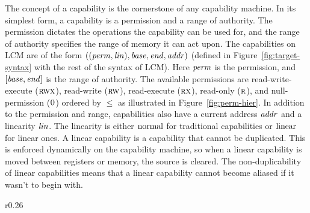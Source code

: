 \documentclass[acmsmall,review,showframe]{acmart}\settopmatter{printfolios=true,printccs=false,printacmref=false}
\newcommand{\trgcm}{\textsc{LCM}}
\begin{document}
The concept of a capability is the cornerstone of any capability machine.
In its simplest form, a capability is a permission and a range of authority.
The permission dictates the operations the capability can be used for, and the range of authority specifies the range of memory it can act upon.
The capabilities on \trgcm{} are of the form $((\mathit{perm},\mathit{lin}),\mathit{base},\mathit{end},\mathit{addr})$ (defined in Figure~\ref{fig:target-syntax} with the rest of the syntax of \trgcm{}). Here $\mathit{perm}$ is the permission, and $[\mathit{base},\mathit{end}]$ is the range of authority.
The available permissions are read-write-execute ($\textsc{rwx}$), read-write ($\textsc{rw}$), read-execute ($\textsc{rx}$), read-only ($\textsc{r}$), and null-permission ($\textsc{0}$) ordered by $\le$ as illustrated in Figure~\ref{fig:perm-hier}.
In addition to the permission and range, capabilities also have a current address $\mathit{addr}$ and a linearity $\mathit{lin}$.
The linearity is either $\mathrm{normal}$ for traditional capabilities or $\mathrm{linear}$ for linear ones.
A linear capability is a capability that cannot be duplicated.
This is enforced dynamically on the capability machine, so when a linear capability is moved between registers or memory, the source is cleared.
The non-duplicability of linear capabilities means that a linear capability cannot become aliased if it wasn't to begin with.
\begin{wrapfigure}{r}{0.26\linewidth}
  \centering

  \caption{Permission hierarchy}
  \label{fig:perm-hier}
\end{wrapfigure}

\end{document}
